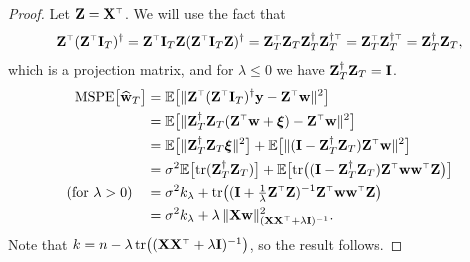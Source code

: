 \documentclass[12pt]{sty/colt2019/colt2018-arxiv}
\begin{document}
\begin{proof}
Let $\Z = \X^\top$. We will use the fact
that
\[\Z^\top(\Z^\top\I_T)^\dagger = \Z^\top\I_T\Z(\Z^\top\I_T\Z)^\dagger=
  \Z_T^\top\Z_T\Z_T^\dagger\Z_T^{\dagger\top}=\Z_T^\top\Z_T^{\dagger\top}= \Z_T^\dagger\Z_T,\]
which is a
projection matrix, and for $\lambda\leq 0$ we have $\mathbf Z_T^\dagger\mathbf Z_T=\mathbf I$.
\begin{align*}
  \MSPE{\wbh_T} &= \E\big[\|\Z^\top(\Z^\top\I_T)^\dagger\y - \Z^\top\w\|^2\big]\\
               &= \E\big[\|\Z_T^\dagger\Z_T(\Z^\top\w+\xib)-\Z^\top\w\|^2\big]\\
               &= \E\big[\|\Z_T^\dagger\Z_T\xib\|^2\big] +
                 \E\big[\|(\I-\Z_T^\dagger\Z_T)\Z^\top\w\|^2\big]\\
  &=\sigma^2\E\big[\tr(\Z_T^\dagger\Z_T)\big] +
    \E\big[\tr\big((\I-\Z_T^\dagger\Z_T)\Z^\top\w\w^\top\Z\big)\big]\\
(\text{for }\lambda>0)\quad  &=\sigma^2k_\lambda +
    \tr\big((\I+\tfrac1\lambda\Z^\top\Z)^{-1}\Z^\top\w\w^\top\Z\big)\\
  &=\sigma^2k_\lambda + \lambda\,\|\X\w\|^2_{(\X\X^\top+\lambda\I)^{-1}}.
\end{align*}
Note that $k = n-\lambda\, \tr\big((\X\X^\top+\lambda\I)^{-1}\big)$, so
the result follows.
\end{proof}
\end{document}
